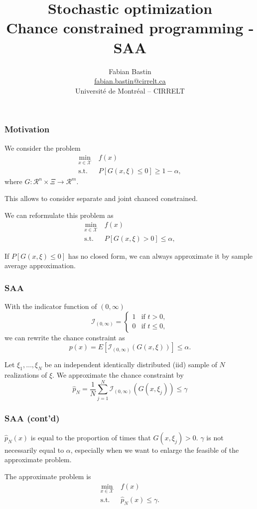 \documentclass{beamer}
\title[CP]{Stochastic optimization\\Chance constrained programming - SAA}
\author[Fabian Bastin]{Fabian Bastin\\\url{fabian.bastin@cirrelt.ca}\\Université de Montréal -- CIRRELT}
\date{}
\begin{document}
\frame{\titlepage}

\begin{frame}
\frametitle{Motivation}

We consider the problem
\begin{align*}
\min_{x \in \mathcal{X}}\ & f(x) \\
\mbox{s.t. } & P[G(x,\xi) \leq 0] \geq 1 - \alpha,
\end{align*}
where $G: \mathcal{R}^n \times \Xi \rightarrow \mathcal{R}^m$.

This allows to consider separate and joint chanced constrained.

We can reformulate this problem as
\begin{align*}
\min_{x \in \mathcal{X}}\ & f(x) \\
\mbox{s.t. } & P[G(x,\xi) > 0] \leq \alpha,
\end{align*}


\mbox{}

If $P[G(x,\xi) \leq 0]$ has no closed form, we can always approximate it by sample average approximation.

\end{frame}

\begin{frame}
\frametitle{SAA}

With the indicator function of $(0,\infty)$
\[
\mathcal{I}_{(0,\infty)} =
\begin{cases}
1 & \mbox{if } t > 0,\\
0 & \mbox{if } t \leq 0,
\end{cases}
\]
we can rewrite the chance constraint as
\[
p(x) = E\left[ \mathcal{I}_{(0,\infty)} \left( G(x, \xi) \right) \right] \leq \alpha.
\]

Let $\xi_1,\ldots,\xi_N$ be an independent identically distributed (iid) sample of $N$ realizations of $\xi$.
We approximate the chance constraint by
\[
\hat{p}_N = \frac{1}{N} \sum_{j = 1}^N \mathcal{I}_{(0,\infty)} \left( G(x, \xi_j) \right) \leq \gamma
\]

\end{frame}

\begin{frame}
\frametitle{SAA (cont'd)}

$\hat{p}_N(x)$ is equal to the proportion of times that $G(x,\xi_j) > 0$.
$\gamma$ is not necessarily equal to $\alpha$, especially when we want to enlarge the feasible of the approximate problem.

\mbox{}

The approximate problem is
\begin{align*}
\min_{x \in \mathcal{X}}\ & f(x) \\
\mbox{s.t. } & \hat{p}_N(x) \leq \gamma.
\end{align*}

\end{frame}
\end{document}
